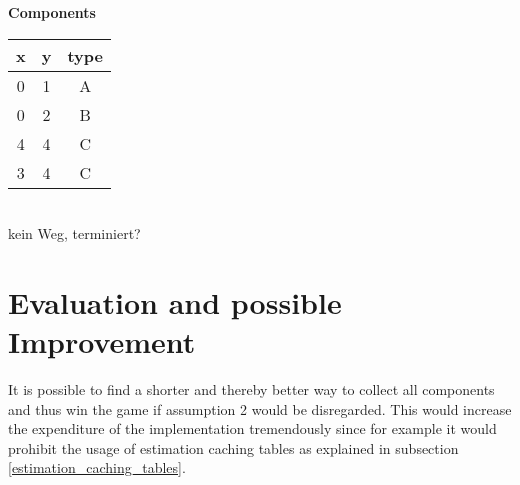 \documentclass{article}
\begin{document}
\textbf{Components}

\begin{tabular}{ |c|c|c| } 
 \hline
 x & y & type  \\ 
 \hline
 0 & 1 & A \\
 0 & 2 & B \\
 4 & 4 & C \\
 3 & 4 & C \\ 
 \hline
\end{tabular}
\\

kein Weg, terminiert?

\section{Evaluation and possible Improvement}
It is possible to find a shorter and thereby better way to collect all components and thus win the game if assumption 2 would be disregarded. 
This would increase the expenditure of the implementation tremendously since for example it would prohibit the usage of estimation caching tables as explained in subsection \ref{estimation_caching_tables}.
\end{document}
